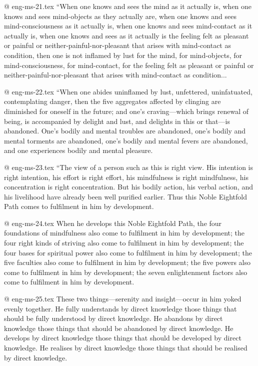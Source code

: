@ eng-ms-21.tex
	“When one knows and sees the mind as it actually is, when one knows and sees mind-objects as they actually are, when one knows and sees mind-consciousness as it actually is, when one knows and sees mind-contact as it actually is, when one knows and sees as it actually is the feeling felt as pleasant or painful or neither-painful-nor-pleasant that arises with mind-contact as condition, then one is not inflamed by lust for the mind, for mind-objects, for mind-consciousness, for mind-contact, for the feeling felt as pleasant or painful or neither-painful-nor-pleasant that arises with mind-contact as condition...

@ eng-ms-22.tex
“When one abides uninflamed by lust, unfettered, uninfatuated, contemplating danger, then the five aggregates affected by clinging are diminished for oneself in the future; and one’s craving—which brings renewal of being, is accompanied by delight and lust, and delights in this or that—is abandoned. One’s bodily and mental troubles are abandoned, one’s bodily and mental torments are abandoned, one’s bodily and mental fevers are abandoned, and one experiences bodily and mental pleasure.

@ eng-ms-23.tex
“The view of a person such as this is right view. His intention is right intention, his effort is right effort, his mindfulness is right mindfulness, his concentration is right concentration. But his bodily action, his verbal action, and his livelihood have already been well purified earlier. Thus this Noble Eightfold Path comes to fulfilment in him by development.

@ eng-ms-24.tex
When he develops this Noble Eightfold Path, the four foundations of mindfulness also come to fulfilment in him by development; the four right kinds of striving also come to fulfilment in him by development; the four bases for spiritual power also come to fulfilment in him by development; the five faculties also come to fulfilment in him by development; the five powers also come to fulfilment in him by development; the seven enlightenment factors also come to fulfilment in him by development.

@ eng-ms-25.tex
These two things—serenity and insight—occur in him yoked evenly together. He fully understands by direct knowledge those things that should be fully understood by direct knowledge. He abandons by direct knowledge those things that should be abandoned by direct knowledge. He develops by direct knowledge those things that should be developed by direct knowledge. He realises by direct knowledge those things that should be realised by direct knowledge.

